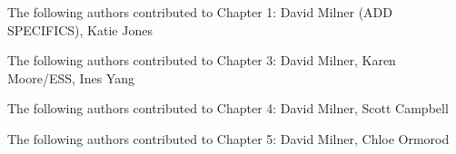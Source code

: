 \noindent The following authors contributed to Chapter 1: David Milner (ADD SPECIFICS), Katie Jones

\noindent The following authors contributed to Chapter 3: David Milner, Karen Moore/ESS, Ines Yang

\noindent The following authors contributed to Chapter 4: David Milner, Scott Campbell

\noindent The following authors contributed to Chapter 5: David Milner, Chloe Ormorod
